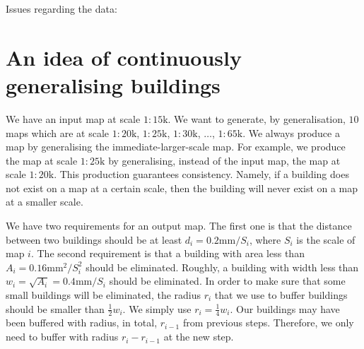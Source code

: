 \documentclass[graybox]{svmult}
\begin{document}
Issues regarding the data:

%

\clearpage

\section{An idea of continuously generalising buildings}
We have an input map at scale $1:15 \mathrm{k}$.
We want to generate, by generalisation, $10$ maps which are at 
scale $1:20\mathrm{k}$, $1:25\mathrm{k}$, 
$1:30\mathrm{k}$, $\dots$, $1:65\mathrm{k}$.
We always produce a map by generalising the 
immediate-larger-scale map. For example, we produce the map at 
scale $1:25\mathrm{k}$ by generalising, instead of the input 
map, the map at scale $1:20\mathrm{k}$.
This production 
guarantees consistency. Namely, if a building does not exist on 
a map at a certain scale, then the building will never exist on 
a map at a smaller scale.

We have two requirements for an output map.
The first one is that the distance between two 
buildings should be at least $d_i=0.2 \mathrm{mm}/S_i$, where 
$S_i$ is the scale of map $i$.
The second requirement is that a building with area less than 
$A_i=0.16\mathrm{mm}^2/S^2_i$ should be eliminated. Roughly, a 
building with width less than 
$w_i=\sqrt{A_i}=0.4\mathrm{mm}/S_i$ should be eliminated.
In order to make sure that some small buildings will be 
eliminated, the radius $r_i$ that we use to buffer buildings 
should be smaller than $\frac{1}{2}w_i$. We simply use 
$r_i=\frac{1}{4}w_i$.
Our buildings may have been buffered with radius, in total, 
$r_{i-1}$ from previous steps.
Therefore, we only need to buffer with radius $r_i-r_{i-1}$ at 
the new 
step.
\end{document}

